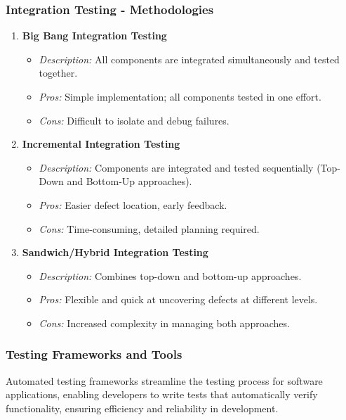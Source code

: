 \documentclass{beamer}
\begin{document}
\begin{frame}[fragile]
    \frametitle{Integration Testing - Methodologies}
    \begin{enumerate}
        \item \textbf{Big Bang Integration Testing}
            \begin{itemize}
                \item \textit{Description:} All components are integrated simultaneously and tested together.
                \item \textit{Pros:} Simple implementation; all components tested in one effort.
                \item \textit{Cons:} Difficult to isolate and debug failures.
            \end{itemize}
            
        \item \textbf{Incremental Integration Testing}
            \begin{itemize}
                \item \textit{Description:} Components are integrated and tested sequentially (Top-Down and Bottom-Up approaches).
                \item \textit{Pros:} Easier defect location, early feedback.
                \item \textit{Cons:} Time-consuming, detailed planning required.
            \end{itemize}
            
        \item \textbf{Sandwich/Hybrid Integration Testing}
            \begin{itemize}
                \item \textit{Description:} Combines top-down and bottom-up approaches.
                \item \textit{Pros:} Flexible and quick at uncovering defects at different levels.
                \item \textit{Cons:} Increased complexity in managing both approaches.
            \end{itemize}
    \end{enumerate}
\end{frame}

\begin{frame}
    \frametitle{Testing Frameworks and Tools}
    Automated testing frameworks streamline the testing process for software applications, enabling developers to write tests that automatically verify functionality, ensuring efficiency and reliability in development.
\end{frame}
\end{document}

